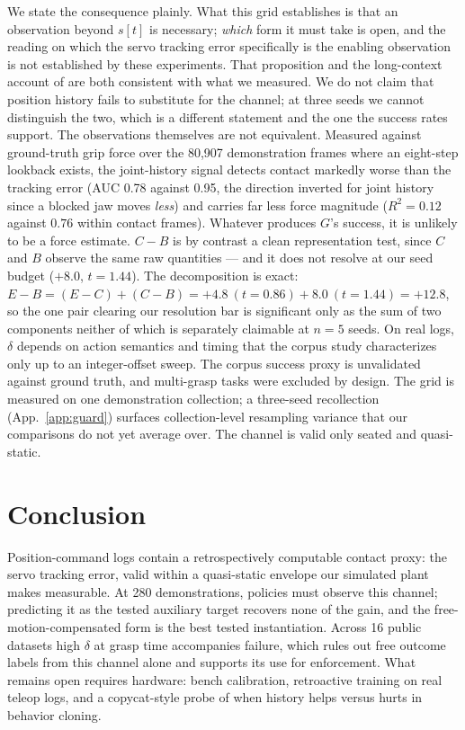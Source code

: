 \documentclass{article}
\begin{document}
We state the consequence plainly. What this grid establishes is that an
observation beyond $s[t]$ is necessary; \emph{which} form it must take is
open, and the reading on which the servo tracking error specifically is the
enabling observation is not established by these experiments. That
proposition and the long-context account of \citet{zeng2026revisiting} are
both consistent with what we measured. We do not claim that position
history fails to substitute for the channel; at three seeds we cannot
distinguish the two, which is a different statement and the one the
success rates support. The observations themselves are not equivalent.
Measured against ground-truth grip force over the 80,907 demonstration
frames where an eight-step lookback exists, the joint-history signal
detects contact markedly worse than the tracking error (AUC 0.78 against
0.95, the direction inverted for joint history since a blocked jaw moves
\emph{less}) and carries far less force magnitude ($R^2 = 0.12$ against
$0.76$ within contact frames). Whatever produces $G$'s success, it is
unlikely to be a force estimate.
$C{-}B$ is by contrast a clean representation test, since $C$ and $B$ observe
the same raw quantities --- and it does not resolve at our seed budget
($+8.0$, $t = 1.44$). The decomposition is exact:
$E{-}B = (E{-}C) + (C{-}B) = +4.8\ (t{=}0.86) + 8.0\ (t{=}1.44) = +12.8$, so
the one pair clearing our resolution bar is significant only as the sum of two
components neither of which is separately claimable at $n=5$ seeds. On real logs, $\delta$ depends on action semantics and timing that the
corpus study characterizes only up to an integer-offset sweep. The corpus
success proxy is unvalidated against ground truth, and multi-grasp tasks
were excluded by design. The grid is measured on one demonstration
collection; a three-seed recollection (App.~\ref{app:guard}) surfaces
collection-level resampling variance that our comparisons do not yet
average over. The channel is valid only seated and quasi-static.


\section{Conclusion}
\label{sec:conclusion}

Position-command logs contain a retrospectively computable contact proxy:
the servo tracking error, valid within a quasi-static envelope our
simulated plant makes measurable. At 280 demonstrations, policies must
observe this channel; predicting it as the tested auxiliary target
recovers none of the gain, and the free-motion-compensated form is the
best tested instantiation. Across 16 public datasets high $\delta$ at
grasp time accompanies failure, which rules out free outcome labels from
this channel alone and supports its use for enforcement. What remains
open requires hardware: bench calibration, retroactive training on real
teleop logs, and a copycat-style probe of when history helps versus hurts
in behavior cloning.
\end{document}
